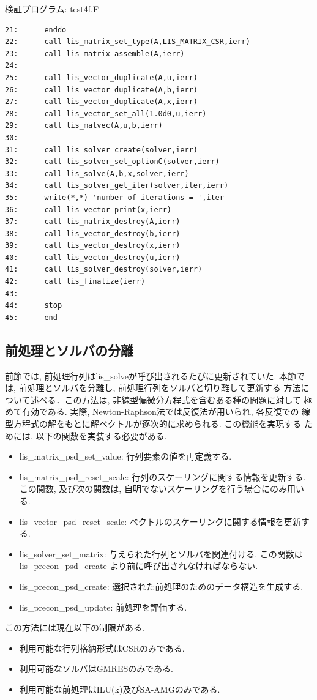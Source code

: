 \documentclass[a4paper]{jarticle}
\begin{document}
{{\begin{itembox}[l]{検証プログラム: test4f.F}
{\begin{verbatim}
21:      enddo
22:      call lis_matrix_set_type(A,LIS_MATRIX_CSR,ierr)
23:      call lis_matrix_assemble(A,ierr)
24:
25:      call lis_vector_duplicate(A,u,ierr)
26:      call lis_vector_duplicate(A,b,ierr)
27:      call lis_vector_duplicate(A,x,ierr)
28:      call lis_vector_set_all(1.0d0,u,ierr)
29:      call lis_matvec(A,u,b,ierr)
30:
31:      call lis_solver_create(solver,ierr)
32:      call lis_solver_set_optionC(solver,ierr)
33:      call lis_solve(A,b,x,solver,ierr)
34:      call lis_solver_get_iter(solver,iter,ierr)
35:      write(*,*) 'number of iterations = ',iter
36:      call lis_vector_print(x,ierr)
37:      call lis_matrix_destroy(A,ierr)
38:      call lis_vector_destroy(b,ierr)
39:      call lis_vector_destroy(x,ierr)
40:      call lis_vector_destroy(u,ierr)
41:      call lis_solver_destroy(solver,ierr)
42:      call lis_finalize(ierr)
43:
44:      stop
45:      end
\end{verbatim}
}
\end{itembox}

\newpage
\subsection{前処理とソルバの分離}
\label{subsec:psd}
前節では, 前処理行列はlis\_solveが呼び出されるたびに更新されていた. 
本節では, 前処理とソルバを分離し, 前処理行列をソルバと切り離して更新する
方法について述べる．この方法は, 非線型偏微分方程式を含むある種の問題に対して
極めて有効である. 実際, Newton-Raphson法では反復法が用いられ, 各反復での
線型方程式の解をもとに解ベクトルが逐次的に求められる. この機能を実現する
ためには, 以下の関数を実装する必要がある.  
%
\begin{itemize}
\item lis\_matrix\_psd\_set\_value: 行列要素の値を再定義する. 
\item lis\_matrix\_psd\_reset\_scale: 行列のスケーリングに関する情報を更新する. この関数, 及び次の関数は, 自明でないスケーリングを行う場合にのみ用いる. 
\item lis\_vector\_psd\_reset\_scale: ベクトルのスケーリングに関する情報を更新する. 
\item lis\_solver\_set\_matrix: 与えられた行列とソルバを関連付ける. この関数は lis\_precon\_psd\_create より前に呼び出されなければならない. 
\item lis\_precon\_psd\_create: 選択された前処理のためのデータ構造を生成する. 
\item lis\_precon\_psd\_update: 前処理を評価する. 
\end{itemize}
%
この方法には現在以下の制限がある. 
%
\begin{itemize}
\item 利用可能な行列格納形式はCSRのみである. 
\item 利用可能なソルバはGMRESのみである. 
\item 利用可能な前処理はILU(k)及びSA-AMGのみである. 
\end{itemize}
%

}}
\end{document}
